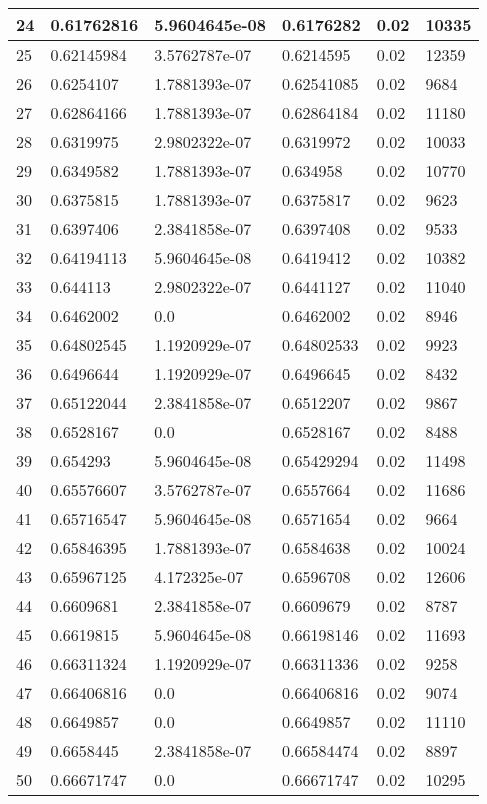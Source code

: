 \begin{longtable}{|l|l|l|l|l|l|}
24 & 0.61762816 & 5.9604645e-08 & 0.6176282 & 0.02 & 10335 \\ \hline 
25 & 0.62145984 & 3.5762787e-07 & 0.6214595 & 0.02 & 12359 \\ \hline 
26 & 0.6254107 & 1.7881393e-07 & 0.62541085 & 0.02 & 9684 \\ \hline 
27 & 0.62864166 & 1.7881393e-07 & 0.62864184 & 0.02 & 11180 \\ \hline 
28 & 0.6319975 & 2.9802322e-07 & 0.6319972 & 0.02 & 10033 \\ \hline 
29 & 0.6349582 & 1.7881393e-07 & 0.634958 & 0.02 & 10770 \\ \hline 
30 & 0.6375815 & 1.7881393e-07 & 0.6375817 & 0.02 & 9623 \\ \hline 
31 & 0.6397406 & 2.3841858e-07 & 0.6397408 & 0.02 & 9533 \\ \hline 
32 & 0.64194113 & 5.9604645e-08 & 0.6419412 & 0.02 & 10382 \\ \hline 
33 & 0.644113 & 2.9802322e-07 & 0.6441127 & 0.02 & 11040 \\ \hline 
34 & 0.6462002 & 0.0 & 0.6462002 & 0.02 & 8946 \\ \hline 
35 & 0.64802545 & 1.1920929e-07 & 0.64802533 & 0.02 & 9923 \\ \hline 
36 & 0.6496644 & 1.1920929e-07 & 0.6496645 & 0.02 & 8432 \\ \hline 
37 & 0.65122044 & 2.3841858e-07 & 0.6512207 & 0.02 & 9867 \\ \hline 
38 & 0.6528167 & 0.0 & 0.6528167 & 0.02 & 8488 \\ \hline 
39 & 0.654293 & 5.9604645e-08 & 0.65429294 & 0.02 & 11498 \\ \hline 
40 & 0.65576607 & 3.5762787e-07 & 0.6557664 & 0.02 & 11686 \\ \hline 
41 & 0.65716547 & 5.9604645e-08 & 0.6571654 & 0.02 & 9664 \\ \hline 
42 & 0.65846395 & 1.7881393e-07 & 0.6584638 & 0.02 & 10024 \\ \hline 
43 & 0.65967125 & 4.172325e-07 & 0.6596708 & 0.02 & 12606 \\ \hline 
44 & 0.6609681 & 2.3841858e-07 & 0.6609679 & 0.02 & 8787 \\ \hline 
45 & 0.6619815 & 5.9604645e-08 & 0.66198146 & 0.02 & 11693 \\ \hline 
46 & 0.66311324 & 1.1920929e-07 & 0.66311336 & 0.02 & 9258 \\ \hline 
47 & 0.66406816 & 0.0 & 0.66406816 & 0.02 & 9074 \\ \hline 
48 & 0.6649857 & 0.0 & 0.6649857 & 0.02 & 11110 \\ \hline 
49 & 0.6658445 & 2.3841858e-07 & 0.66584474 & 0.02 & 8897 \\ \hline 
50 & 0.66671747 & 0.0 & 0.66671747 & 0.02 & 10295 \\ \hline 
\end{longtable}